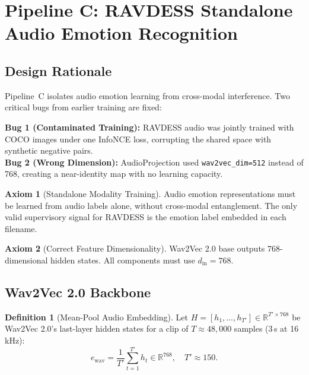 \documentclass[12pt,a4paper]{article}
\theoremstyle{definition}
\newtheorem{definition}{Definition}[section]
\newtheorem{axiom}{Axiom}[section]
\theoremstyle{plain}
\theoremstyle{remark}
\newcommand{\R}{\mathbb{R}}
\begin{document}
\newpage
\section{Pipeline C: RAVDESS Standalone Audio Emotion Recognition}
\label{sec:pipelineC}

\subsection{Design Rationale}

Pipeline~C isolates audio emotion learning from cross-modal interference. Two critical bugs from earlier training are fixed:

\begin{tcolorbox}[keybox,title={Two Bugs Fixed by Pipeline C}]
\textbf{Bug 1 (Contaminated Training):} RAVDESS audio was jointly trained with COCO images under one InfoNCE loss, corrupting the shared space with synthetic negative pairs.\\
\textbf{Bug 2 (Wrong Dimension):} AudioProjection used \texttt{wav2vec\_dim=512} instead of 768, creating a near-identity map with no learning capacity.
\end{tcolorbox}

\begin{axiom}[Standalone Modality Training]
Audio emotion representations must be learned from audio labels alone, without cross-modal entanglement. The only valid supervisory signal for RAVDESS is the emotion label embedded in each filename.
\end{axiom}

\begin{axiom}[Correct Feature Dimensionality]
Wav2Vec 2.0 base outputs $768$-dimensional hidden states. All components must use $d_{\text{in}} = 768$.
\end{axiom}

\subsection{Wav2Vec 2.0 Backbone}

\begin{definition}[Mean-Pool Audio Embedding]
Let $H = [h_1,\ldots,h_{T'}] \in \R^{T' \times 768}$ be Wav2Vec 2.0's last-layer hidden states for a clip of $T \approx 48{,}000$ samples (3\,s at 16\,kHz):
\[
  e_{\text{wav}} = \frac{1}{T'}\sum_{t=1}^{T'} h_t \in \R^{768}, \quad T' \approx 150.
\]
\end{definition}
\end{document}
